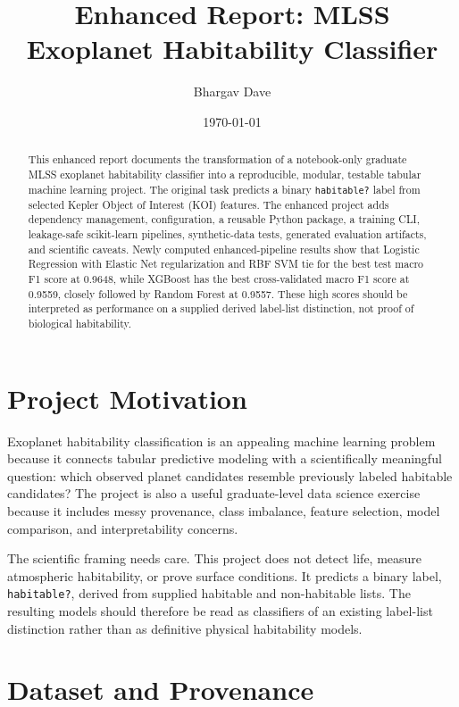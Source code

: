 \documentclass[11pt]{article}
\title{Enhanced Report: MLSS Exoplanet Habitability Classifier}
\author{Bhargav Dave}
\date{\today}
\newcommand{\code}[1]{\texttt{#1}}
\begin{document}
\maketitle

\begin{abstract}
This enhanced report documents the transformation of a notebook-only graduate MLSS exoplanet habitability classifier into a reproducible, modular, testable tabular machine learning project. The original task predicts a binary \code{habitable?} label from selected Kepler Object of Interest (KOI) features. The enhanced project adds dependency management, configuration, a reusable Python package, a training CLI, leakage-safe scikit-learn pipelines, synthetic-data tests, generated evaluation artifacts, and scientific caveats. Newly computed enhanced-pipeline results show that Logistic Regression with Elastic Net regularization and RBF SVM tie for the best test macro F1 score at 0.9648, while XGBoost has the best cross-validated macro F1 score at 0.9559, closely followed by Random Forest at 0.9557. These high scores should be interpreted as performance on a supplied derived label-list distinction, not proof of biological habitability.
\end{abstract}

\tableofcontents
\newpage

\section{Project Motivation}

Exoplanet habitability classification is an appealing machine learning problem because it connects tabular predictive modeling with a scientifically meaningful question: which observed planet candidates resemble previously labeled habitable candidates? The project is also a useful graduate-level data science exercise because it includes messy provenance, class imbalance, feature selection, model comparison, and interpretability concerns.

The scientific framing needs care. This project does not detect life, measure atmospheric habitability, or prove surface conditions. It predicts a binary label, \code{habitable?}, derived from supplied habitable and non-habitable lists. The resulting models should therefore be read as classifiers of an existing label-list distinction rather than as definitive physical habitability models.

\section{Dataset and Provenance}
\end{document}
